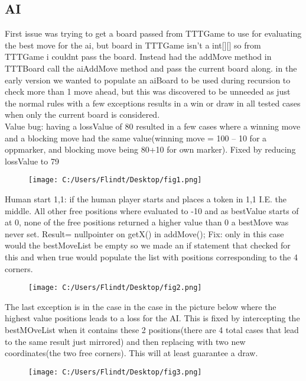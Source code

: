 \documentclass[a4paper,10pt]{article}
\begin{document}
	\subsection{AI}
	First issue was trying to get a board passed from TTTGame to use for evaluating the best move for the ai, but board in TTTGame isn’t a int[][] so from TTTGame i couldnt pass the board. Instead had the addMove method in TTTBoard call the aiAddMove method and pass the current board along.
	in the early version we wanted to populate an aiBoard to be used during recursion to check more than 1 move ahead, but this was discovered to be unneeded as just the normal rules with a few exceptions results in a win or draw in all tested cases when only the current board is considered.\\
	
	Value bug: having a lossValue of 80 resulted in a few cases where a winning move and a blocking move had the same value(winning move = 100 – 10 for a oppmarker, and blocking move being 80+10 for own marker). 
	Fixed by reducing lossValue to 79
	
	\begin{figure}[H]\center
		\texttt{[image: C:/Users/Flindt/Desktop/fig1.png]}
		\caption{}
	\end{figure}	
	
	
	Human start 1,1: if the human player starts and places a token in 1,1 I.E. the middle. All other free positions where evaluated to -10 and as bestValue starts of at 0, none of the free positions returned a higher value than 0 a bestMove was never set. Result= nullpointer on getX() in addMove();
	Fix: only in this case would the bestMoveList be empty so we made an if statement that checked for this and when true would populate the list with positions corresponding to the 4 corners.
	\begin{figure}[H]\center
		\texttt{[image: C:/Users/Flindt/Desktop/fig2.png]}
		\caption{}
	\end{figure}	
	The last exception is in the case in the case in the picture below where the highest value positions leads to a loss for the AI. This is fixed by intercepting the bestMOveList when it contains these 2 positions(there are 4 total cases that lead to the same result just mirrored) and then replacing with two new coordinates(the two free corners). This will at least guarantee a draw. 
	\begin{figure}[H]\center
		\texttt{[image: C:/Users/Flindt/Desktop/fig3.png]}
		\caption{}
	\end{figure}
	
\end{document}
